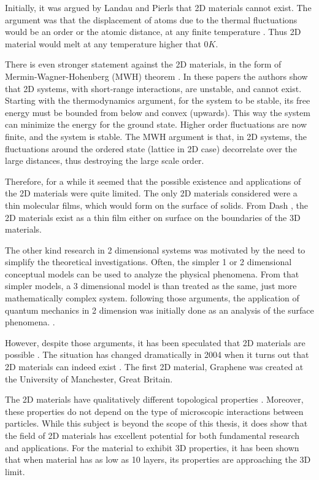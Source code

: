 Initially, it was argued by Landau and Pierls \cite{LandauG}\cite{Pierls} that 2D materials cannot exist. The argument was that the displacement of atoms due to the thermal fluctuations would be an order or the atomic distance, at any finite temperature \cite{LandauG, Pierls}. Thus 2D material would melt at any temperature higher that $ 0 K $. 

There is even stronger statement against the 2D materials, in the form of Mermin-Wagner-Hohenberg (MWH) theorem \cite{Hohenberg}\cite{Mermin2}. In these papers the authors show that 2D systems, with short-range interactions, are unstable, and cannot exist. 
Starting with the thermodynamics argument, for the system to be stable, its free energy must be bounded from below and convex (upwards). This way the system can minimize the energy for the ground state. Higher order fluctuations are now finite, and the system is stable.
The MWH argument is that, in 2D systems, the fluctuations around the ordered state (lattice in 2D case) decorrelate over the large distances, thus destroying the large scale order. 

Therefore, for a while it seemed that the possible existence and applications of the 2D materials were quite limited. The only 2D materials considered were a thin molecular films, which would form on the surface of solids. From Dash \cite{2DMatter1}, the 2D materials exist as a thin film either on surface on the boundaries of the 3D materials.

The other kind research in 2 dimensional systems was motivated by the need to simplify the theoretical investigations. Often, the simpler 1 or 2 dimensional conceptual models can be used to analyze the physical phenomena. From that simpler models, a 3 dimensional model is than treated as the same, just more mathematically complex system.  following those arguments, the application of  quantum mechanics in 2 dimension was initially done as an analysis of the surface phenomena. \cite{2dfilm}. 

However, despite those arguments, it has been speculated that 2D materials are possible \cite{2DMatter1}. The situation has changed dramatically in 2004 when it turns out that 2D materials can indeed exist \cite{Graphene0}. The first 2D material, Graphene was created \cite{GrapheneN} at the University of Manchester, Great Britain.

The 2D materials have qualitatively different topological properties \cite{2DMatterCurvature}. Moreover, these properties do not depend on the type of microscopic interactions between particles. While this subject is beyond the scope of this thesis, it does show that the field of 2D materials has excellent potential for both fundamental research and applications. For the material to exhibit 3D properties, it has been shown \cite{GraphLayers} that when material has as low as 10 layers, its properties are approaching the 3D limit.

